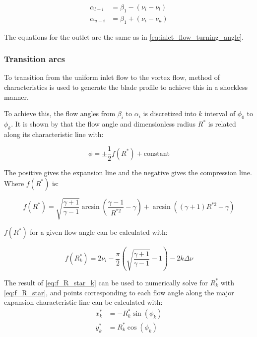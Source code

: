 \begin{equation}
\begin{aligned}
    \alpha_{l-i} & = \beta_1 - (\nu_i - \nu_l) \\
    \alpha_{u-i} & = \beta_1 + (\nu_i - \nu_u)
\end{aligned}
\label{eq:inlet_flow_turning_angle}
\end{equation}

The equations for the outlet are the same as in \cref{eq:inlet_flow_turning_angle}.

\subsubsection{Transition arcs}

To transition from the uniform inlet flow to the vortex flow, method of characteristics is used to generate the blade profile to achieve this in a shockless manner. 


To achieve this, the flow angles from $\beta_i$ to $\alpha_i$ is discretized into $k$ interval of $\phi_0$ to $\phi_k$. It is shown by  that the flow angle and dimensionless radius $R^*$ is related along its characteristic line with:

\begin{equation}
    \phi = \pm \frac{1}{2}f(R^*) + \textrm{constant}
    \label{eq:characteristic_line_equation}
\end{equation}

The positive gives the expansion line and the negative gives the compression line. Where $f(R^*)$ is:

\begin{equation}
    f(R^*) = \sqrt{\frac{\gamma + 1}{\gamma - 1}}\arcsin\left(\frac{\gamma-1}{R^{*2}} - \gamma\right) + \arcsin\left(\left(\gamma+1\right)R^{*2} - \gamma\right)
    \label{eq:f_R_star}
\end{equation}

$f(R^*)$ for a given flow angle can be calculated with:

\begin{equation}
    f(R^*_k) = 2\nu_i - \frac{\pi}{2}\left(\sqrt{\frac{\gamma+1}{\gamma-1}} - 1\right) - 2k\Delta\nu
    \label{eq:f_R_star_k}
\end{equation}

The result of \cref{eq:f_R_star_k} can be used to numerically solve for $R^*_k$ with \cref{eq:f_R_star}, and points corresponding to each flow angle along the major expansion characteristic line can be calculated with:
\begin{equation}
    \begin{aligned}
    x^*_{k} & = -R^*_k \sin(\phi_k) \\
    y^*_{k} & = R^*_k \cos(\phi_k)
    \end{aligned}
\end{equation}


